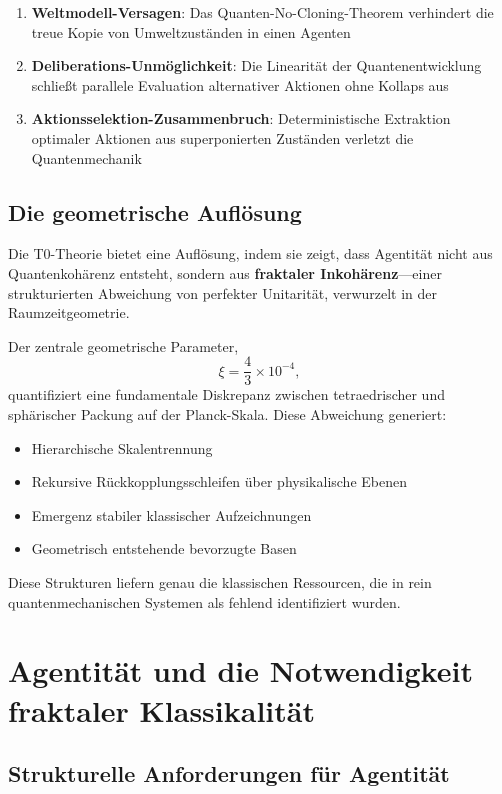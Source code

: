 	\begin{enumerate}
		\item \textbf{Weltmodell-Versagen}: Das Quanten-No-Cloning-Theorem verhindert die treue Kopie von Umweltzuständen in einen Agenten
		\item \textbf{Deliberations-Unmöglichkeit}: Die Linearität der Quantenentwicklung schließt parallele Evaluation alternativer Aktionen ohne Kollaps aus
		\item \textbf{Aktionsselektion-Zusammenbruch}: Deterministische Extraktion optimaler Aktionen aus superponierten Zuständen verletzt die Quantenmechanik
	\end{enumerate}
	
	\subsection{Die geometrische Auflösung}
	
	Die T0-Theorie bietet eine Auflösung, indem sie zeigt, dass Agentität nicht aus Quantenkohärenz entsteht, sondern aus \textbf{fraktaler Inkohärenz}—einer strukturierten Abweichung von perfekter Unitarität, verwurzelt in der Raumzeitgeometrie.
	
	Der zentrale geometrische Parameter,
	\[
	\xi = \frac{4}{3} \times 10^{-4},
	\]
	quantifiziert eine fundamentale Diskrepanz zwischen tetraedrischer und sphärischer Packung auf der Planck-Skala. Diese Abweichung generiert:
	
	\begin{itemize}
		\item Hierarchische Skalentrennung
		\item Rekursive Rückkopplungsschleifen über physikalische Ebenen
		\item Emergenz stabiler klassischer Aufzeichnungen
		\item Geometrisch entstehende bevorzugte Basen
	\end{itemize}
	
	Diese Strukturen liefern genau die klassischen Ressourcen, die in rein quantenmechanischen Systemen als fehlend identifiziert wurden.
	
	\section{Agentität und die Notwendigkeit fraktaler Klassikalität}
	
	\subsection{Strukturelle Anforderungen für Agentität}
	
